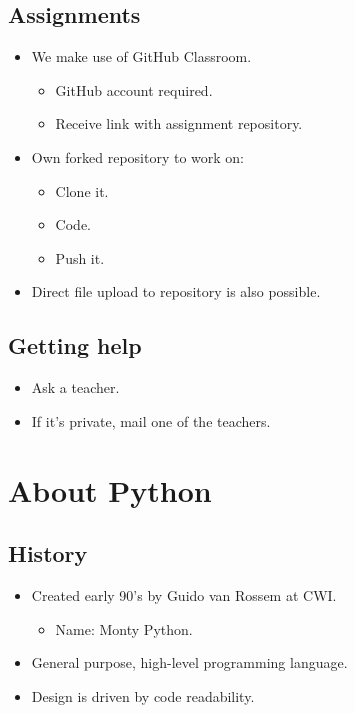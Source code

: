 \documentclass[slidestop]{beamer}
\begin{document}
\subsection{Assignments}
\begin{pframe}
 \begin{itemize}
  \item We make use of GitHub Classroom.
  \begin{itemize}
   \item GitHub account required.
   \item Receive link with assignment repository.
  \end{itemize}
  \item Own forked repository to work on:
  \begin{itemize}
   \item Clone it.
   \item Code.
   \item Push it.
  \end{itemize}
  \item Direct file upload to repository is also possible.
 \end{itemize}
\end{pframe}

\subsection{Getting help}
\begin{pframe}
 \begin{itemize}
  \item Ask a teacher.
  \item If it's private, mail one of the teachers.
 \end{itemize}
\end{pframe}

\section{About Python}

\subsection{History}
\begin{pframe}
 \begin{itemize}
  \item Created early 90's by Guido van Rossem at CWI.
  \begin{itemize}
   \item Name: Monty Python.
  \end{itemize}
  \item General purpose, high-level programming language.
  \item Design is driven by code readability.
 \end{itemize}
\end{pframe}
\end{document}
